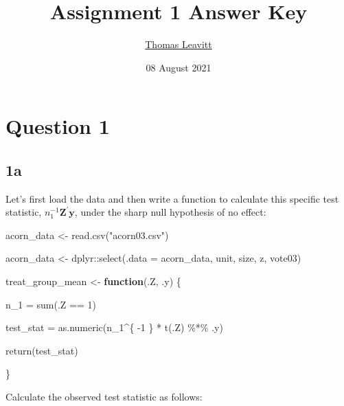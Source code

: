 \documentclass[
  12pt,
  leqno]{article}
\title{Assignment 1 Answer Key}
\author{\href{mailto:tl2624@columbia.edu}{Thomas Leavitt}}
\date{08 August 2021}
\newenvironment{Shaded}{\begin{snugshade}}{\end{snugshade}}
\newcommand{\AttributeTok}[1]{\textcolor[rgb]{0.77,0.63,0.00}{#1}}
\newcommand{\ControlFlowTok}[1]{\textcolor[rgb]{0.13,0.29,0.53}{\textbf{#1}}}
\newcommand{\DecValTok}[1]{\textcolor[rgb]{0.00,0.00,0.81}{#1}}
\newcommand{\FunctionTok}[1]{\textcolor[rgb]{0.00,0.00,0.00}{#1}}
\newcommand{\NormalTok}[1]{#1}
\newcommand{\OtherTok}[1]{\textcolor[rgb]{0.56,0.35,0.01}{#1}}
\newcommand{\SpecialCharTok}[1]{\textcolor[rgb]{0.00,0.00,0.00}{#1}}
\newcommand{\StringTok}[1]{\textcolor[rgb]{0.31,0.60,0.02}{#1}}
\DeclareMathOperator{\1}{\mathbbm{1}}
\begin{document}
\maketitle

\section*{Question 1}

\subsection*{1a}

Let's first load the data and then write a function to calculate this
specific test statistic, \(n_1^{-1}\mathbf{Z}^{\prime}\mathbf{y}\),
under the sharp null hypothesis of no effect:

\scriptsize

\begin{Shaded}
\begin{Highlighting}[]
\NormalTok{acorn\_data }\OtherTok{\textless{}{-}} \FunctionTok{read.csv}\NormalTok{(}\StringTok{"acorn03.csv"}\NormalTok{)}

\NormalTok{acorn\_data }\OtherTok{\textless{}{-}}\NormalTok{ dplyr}\SpecialCharTok{::}\FunctionTok{select}\NormalTok{(}\AttributeTok{.data =}\NormalTok{ acorn\_data, unit, size, z, vote03)}

\NormalTok{treat\_group\_mean }\OtherTok{\textless{}{-}} \ControlFlowTok{function}\NormalTok{(.Z, .y) \{}

\NormalTok{    n\_1 }\OtherTok{=} \FunctionTok{sum}\NormalTok{(.Z }\SpecialCharTok{==} \DecValTok{1}\NormalTok{)}

\NormalTok{    test\_stat }\OtherTok{=} \FunctionTok{as.numeric}\NormalTok{(n\_1}\SpecialCharTok{\^{}}\NormalTok{\{}
        \SpecialCharTok{{-}}\DecValTok{1}
\NormalTok{    \} }\SpecialCharTok{*} \FunctionTok{t}\NormalTok{(.Z) }\SpecialCharTok{\%*\%}\NormalTok{ .y)}

    \FunctionTok{return}\NormalTok{(test\_stat)}

\NormalTok{\}}
\end{Highlighting}
\end{Shaded}

\normalsize

Calculate the observed test statistic as follows: \scriptsize

\begin{Shaded}
\end{Shaded}
\end{document}
